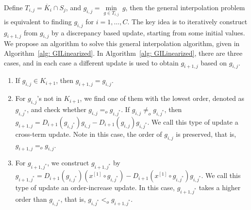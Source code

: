 \documentclass[11pt,onecolumn,draftcls]{IEEEtran}
\begin{document}
Define $T_{i,j} = \overline{K}_i \cap S_j$, and $g_{i,j} = \min \limits_{g \in T_{i,j}} ~g$, then the general interpolation problem is equivalent to finding $g_{i,j}$ for $i = 1, \ldots, C$. The key idea is to iteratively construct $g_{i+1,j}$ from $g_{i,j}$ by a discrepancy based update, starting from some initial values. We propose an algorithm to solve this general interpolation algorithm, given in  Algorithm~\ref{alg: GILinearized}. In Algorithm~\ref{alg: GILinearized}, there are three cases, and in each case a different update is used to obtain $g_{i+1, j}$ based on $g_{i, j}$.
\begin{enumerate}
\item If $g_{i,j} \in K_{i+1}$, then $g_{i+1,j} = g_{i,j}$.
\item For $g_{i,j}$'s not in $K_{i+1}$, we find one of them with the lowest order, denoted as $g_{i,j^*}$, and check whether $g_{i,j} =_o g_{i,j^*}$. If $g_{i, j} \ne_o g_{i, j^*}$, then $g_{i+1,j} = D_{i+1}(g_{i,j^*}) g_{i,j} - D_{i+1}(g_{i,j}) g_{i,j^*}$. We call this type of update a cross-term update. Note in this case, the order of $g_{i,j}$ is preserved, that is, $g_{i+1, j} =_o g_{i,j}$.
\item For $g_{i+1, j^*}$, we construct $g_{i+1,j^*}$ by $g_{i+1,j^*} = D_{i+1}(g_{i,j^*}) (x^{[1]} \circ g_{i,j^*}) - D_{i+1}(x^{[1]} \circ g_{i,j^*})g_{i,j^*}$. We call this type of update an order-increase update. In this case, $g_{i+1, j^*}$ takes a higher order than $g_{i,j^*}$, that is, $g_{i, j^*} <_o g_{i+1,j^*}$.
\end{enumerate}
\end{document}
